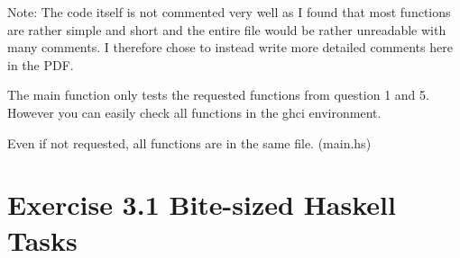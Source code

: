 \documentclass{article} %
\newcommand{\homeworkNumber}{3} %
\begin{document}
Note:
The code itself is not commented very well as I found that most functions are rather simple and short and the entire file would be rather unreadable with many comments. I therefore chose to instead write more detailed comments here in the PDF.

The main function only tests the requested functions from question 1 and 5. However you can easily check all functions in the ghci environment.

Even if not requested, all functions are in the same file. (main.hs)


\section*{Exercise \homeworkNumber.1 Bite-sized Haskell Tasks}
\end{document}
